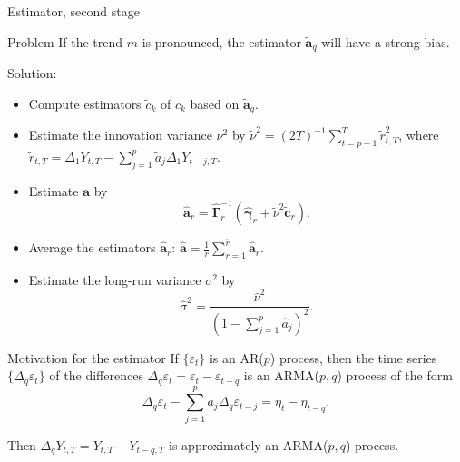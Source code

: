 \documentclass[10pt]{beamer}
\begin{document}
\begin{frame}{Estimator, second stage}
\begin{block}{Problem}
If the trend $m$ is pronounced, the estimator $\widetilde{\boldsymbol{a}}_q$ will have a strong bias.
\end{block}\pause
\vspace{-2mm}
Solution:
\begin{itemize}
	\item \vspace{-2mm} Compute estimators $\widetilde{c}_k$ of $c_k$ based on $\widetilde{\boldsymbol{a}}_q$.\pause
	\item Estimate the innovation variance $\nu^2$ by $\widetilde{\nu}^2 = (2T)^{-1} \sum_{t=p+1}^T \widetilde{r}_{t,T}^2$, where $\widetilde{r}_{t,T} = \Delta_1 Y_{t,T} - \sum_{j=1}^p \widetilde{a}_j \Delta_1 Y_{t-j,T}$.\pause
	\item Estimate $\boldsymbol{a}$ by 
\begin{equation*}\label{est-AR-SS} 
\widehat{\boldsymbol{a}}_r = \widehat{\boldsymbol{\Gamma}}_r^{-1} (\widehat{\boldsymbol{\gamma}}_r + \widetilde{\nu}^2 \widetilde{\boldsymbol{c}}_r).
\end{equation*}\pause
	\item \vspace{-2mm} Average the estimators $\widehat{\boldsymbol{a}}_r$: $\widehat{\boldsymbol{a}} = \frac{1}{\overline{r}} \sum\limits_{r=1}^{\overline{r}} \widehat{\boldsymbol{a}}_r$.\pause
	\item Estimate the long-run variance $\sigma^2$ by 
\begin{equation*} \label{est-lrv}
\widehat{\sigma}^2 = \frac{\widehat{\nu}^2}{(1 - \sum_{j=1}^p \widehat{a}_j)^2}. 
\end{equation*}
\end{itemize}
\end{frame}



\begin{frame}{Motivation for the estimator}
If $\{\varepsilon_t\}$ is an AR($p$) process, then the time series $\{ \Delta_q \varepsilon_t \}$ of the differences $\Delta_q \varepsilon_t = \varepsilon_t - \varepsilon_{t-q}$ is an ARMA($p,q$) process of the form 
\begin{equation*}
\Delta_q \varepsilon_t - \sum_{j=1}^p a_j \Delta_q \varepsilon_{t-j} = \eta_t - \eta_{t-q}. 
\end{equation*}\pause

Then $\Delta_q Y_{t, T} = Y_{t, T} - Y_{t-q, T}$ is approximately an ARMA($p,q$) process.
\end{frame}
\end{document}
